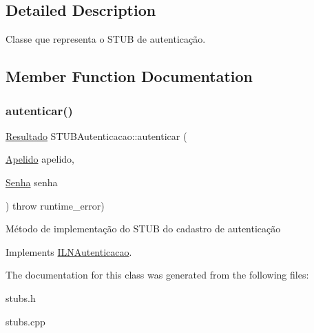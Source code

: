 \subsection{Detailed Description}
Classe que representa o S\+T\+UB de autenticação. 

\subsection{Member Function Documentation}
\mbox{\label{classSTUBAutenticacao_a63f0480adb96e8575700698a47dc2984}} 
\subsubsection{\texorpdfstring{autenticar()}{autenticar()}}
{\footnotesize\ttfamily \hyperlink{classResultado}{Resultado} S\+T\+U\+B\+Autenticacao\+::autenticar (\begin{DoxyParamCaption}\item[{\hyperlink{classApelido}{Apelido}}]{apelido,  }\item[{\hyperlink{classSenha}{Senha}}]{senha }\end{DoxyParamCaption}) throw  runtime\+\_\+error) \hspace{0.3cm}{\ttfamily [virtual]}}

Método de implementação do S\+T\+UB do cadastro de autenticação 

Implements \hyperlink{classILNAutenticacao}{I\+L\+N\+Autenticacao}.



The documentation for this class was generated from the following files\+:\begin{DoxyCompactItemize}
\item 
stubs.\+h\item 
stubs.\+cpp\end{DoxyCompactItemize}
